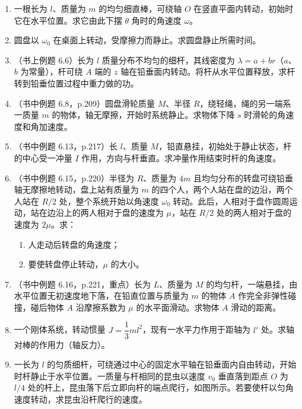 \documentclass{ctexart}
\begin{document}
\begin{enumerate}
\item 一根长为 $l$、质量为 $m$ 的均匀细直棒，可绕轴 $O$ 在竖直平面内转动，初始时它在水平位置。求它由此下摆 $\theta$ 角时的角速度 $\omega$。

\item 圆盘以 $\omega_0$ 在桌面上转动，受摩擦力而静止。求圆盘静止所需时间。

\item（书上例题 6.6）长为 $l$ 质量分布不均匀的细杆，其线密度为 $\lambda = a + br$（$a$、$b$ 为常量），杆可绕 $A$ 端的 $z$ 轴在铅垂面内转动。将杆从水平位置释放，求杆转到铅垂位置过程中重力做的功。

\item（书中例题 6.8，p.209）圆盘滑轮质量 $M$、半径 $R$，绕轻绳，绳的另一端系一质量 $m$ 的物体，轴无摩擦，开始时系统静止。求物体下降 $s$ 时滑轮的角速度和角加速度。

\item（书中例题 6.13，p.217）长 $l$、质量 $M$，铅直悬挂，初始处于静止状态，杆的中心受一冲量 $I$ 作用，方向与杆垂直。求冲量作用结束时杆的角速度。

\item（书中例题 6.15，p.220）半径为 $R$、质量为 $4m$ 且均匀分布的转盘可绕铅垂轴无摩擦地转动，盘上站有质量为 $m$ 的四个人，两个人站在盘的边沿，两个人站在 $R/2$ 处，整个系统开始以角速度 $\omega_0$ 转动。此后，人相对于盘作圆周运动，站在边沿上的两人相对于盘的速度为 $\mu$，站在 $R/2$ 处的两人相对于盘的速度为 $2\mu$。求：
\begin{enumerate}
  \item 人走动后转盘的角速度；
  \item 要使转盘停止转动，$\mu$ 的大小。
\end{enumerate}

\item（书中例题 6.16，p.221，重点）长为 $L$、质量为 $M$ 的均匀杆，一端悬挂，由水平位置无初速度地下落，在铅直位置与质量为 $m$ 的物体 $A$ 作完全非弹性碰撞，碰后物体 $A$ 沿摩擦系数为 $\mu$ 的水平面滑动。求物体 $A$ 滑动的距离。

\item 一个刚体系统，转动惯量 $J = \dfrac13 ml^{2}$，现有一水平力作用于距轴为 $l'$ 处。求轴对棒的作用力（轴反力）。

\item 一长为 $l$ 的匀质细杆，可绕通过中心的固定水平轴在铅垂面内自由转动，开始时杆静止于水平位置。一质量与杆相同的昆虫以速度 $v_0$ 垂直落到距点 $O$ 为 $l/4$ 处的杆上，昆虫落下后立即向杆的端点爬行，如图所示。若要使杆以匀角速度转动，求昆虫沿杆爬行的速度。

\end{enumerate}
\end{document}
